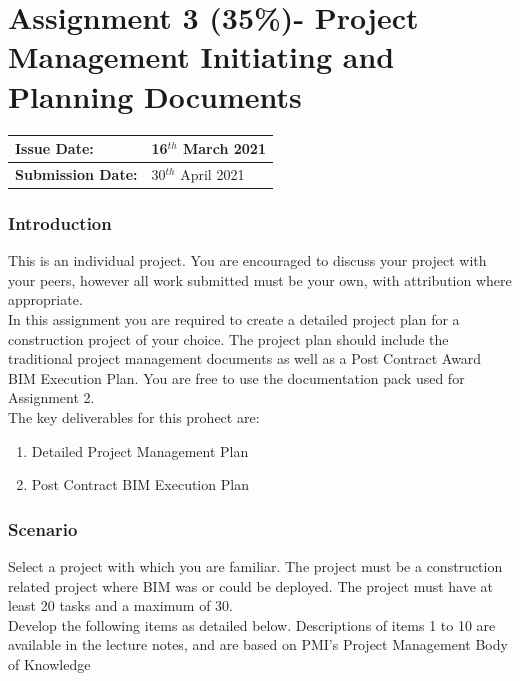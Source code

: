 
	

\part*{Assignment 3 (35\%)- Project Management Initiating and Planning Documents}


\begin{tabularx}{\textwidth}{ |X|X| }
	\hline
	\textbf{Issue Date:} & 16$^{th}$ March 2021\\
	\hline 
	\textbf{Submission Date:}  & 30$^{th}$ April 2021\\
	\hline
\end{tabularx}

\section*{Introduction}

This is an individual project.  You are encouraged to discuss your project with your peers, however all work submitted must be your own, with attribution where appropriate.\\

In this assignment you are required to create a detailed project plan for a construction project of your choice.  The project plan should include the traditional project management documents as well as a Post Contract Award BIM Execution Plan.  You are free to use the documentation pack used for Assignment 2.\\

The key deliverables for this prohect are:

\begin{enumerate}
	\item Detailed Project Management Plan 
	\item Post Contract BIM Execution Plan
\end{enumerate}


\section*{Scenario}

Select a project with which you are familiar. The project must be a construction related project where BIM was or could be deployed.  The project must have at least 20 tasks and a maximum of 30.\\

Develop the following items as detailed below. Descriptions of items 1 to 10 are available in the lecture notes, and are based on PMI's Project Management Body of Knowledge\\

